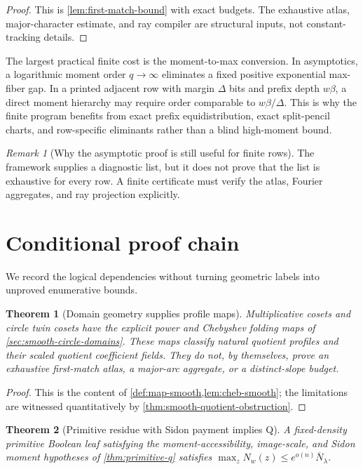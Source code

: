\documentclass[12pt,a4paper]{amsart}
\numberwithin{equation}{section}
\newtheorem{theorem}{Theorem}[section]
\theoremstyle{remark}
\newtheorem{remark}[remark]{Remark}
\newcommand{\barN}{\overline N}
\begin{document}
\begin{proof}
This is \cref{lem:first-match-bound} with exact budgets.  The exhaustive
atlas, major-character estimate, and ray compiler are structural inputs,
not constant-tracking details.
\end{proof}

The largest practical finite cost is the moment-to-max conversion.  In asymptotics, a logarithmic moment order \(q\to\infty\) eliminates a fixed positive exponential max-fiber gap.  In a printed adjacent row with margin \(\Delta\) bits and prefix depth \(w\beta\), a direct moment hierarchy may require order comparable to \(w\beta/\Delta\).  This is why the finite program benefits from exact prefix equidistribution, exact split-pencil charts, and row-specific eliminants rather than a blind high-moment bound.

\begin{remark}[Why the asymptotic proof is still useful for finite rows]
The framework supplies a diagnostic list, but it does not prove that the
list is exhaustive for every row.  A finite certificate must verify the
atlas, Fourier aggregates, and ray projection explicitly.
\end{remark}

\section{Conditional proof chain}\label{sec:complete-chain}

We record the logical dependencies without turning geometric labels into
unproved enumerative bounds.

\begin{theorem}[Domain geometry supplies profile maps]\label{thm:domain-to-ledger-final}
Multiplicative cosets and circle twin cosets have the explicit power and
Chebyshev folding maps of \cref{sec:smooth-circle-domains}.  These maps
classify natural quotient profiles and their scaled quotient coefficient
fields.  They do
not, by themselves, prove an exhaustive first-match atlas, a major-arc
aggregate, or a distinct-slope budget.
\end{theorem}

\begin{proof}
This is the content of \cref{def:map-smooth,lem:cheb-smooth}; the limitations
are witnessed quantitatively by \cref{thm:smooth-quotient-obstruction}.
\end{proof}

\begin{theorem}[Primitive residue with Sidon payment implies Q]\label{thm:primitive-to-q-final}
A fixed-density primitive Boolean leaf satisfying the moment-accessibility,
image-scale, and Sidon moment hypotheses of \cref{thm:primitive-q}
satisfies \(\max_zN_w(z)\le e^{o(n)}\barN_\lambda\).
\end{theorem}
\end{document}
